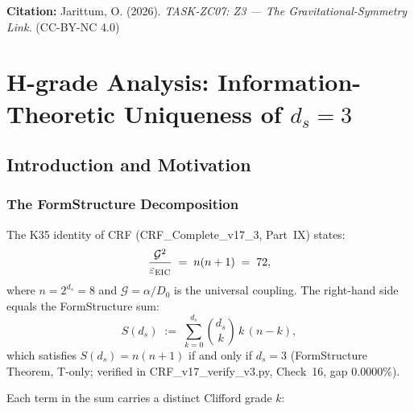 \documentclass[12pt, a4paper]{article}
\begin{document}
\medskip
\begin{center}
\textbf{Citation:} Jarittum, O. (2026).
\textit{TASK-ZC07: Z3 --- The Gravitational-Symmetry Link.}
\quad (CC-BY-NC 4.0)
\end{center}

\bigskip


\section{H-grade Analysis: Information-Theoretic Uniqueness of $d_s = 3$}
\label{sec:hgrade}

\subsection{Introduction and Motivation}

\subsubsection{The FormStructure Decomposition}

The K35 identity of CRF (CRF\_Complete\_v17\_3, Part~IX) states:
\begin{equation}
  \frac{\mathcal{G}^2}{\varepsilon_{\rm EIC}}
  \;=\; n(n+1) \;=\; 72,
  \label{eq:K35}
\end{equation}
where $n = 2^{d_s} = 8$ and $\mathcal{G} = \alpha/D_0$ is the
universal coupling. The right-hand side equals the FormStructure
sum:
\begin{equation}
  S(d_s) \;:=\; \sum_{k=0}^{d_s} \binom{d_s}{k}\, k\,(n-k),
  \label{eq:FormStructure-sum}
\end{equation}
which satisfies $S(d_s) = n(n+1)$ if and only if $d_s = 3$
(FormStructure Theorem, T-only; verified in
CRF\_v17\_verify\_v3.py, Check~16, gap $0.0000\%$).

Each term in the sum carries a distinct Clifford grade $k$:
\end{document}
